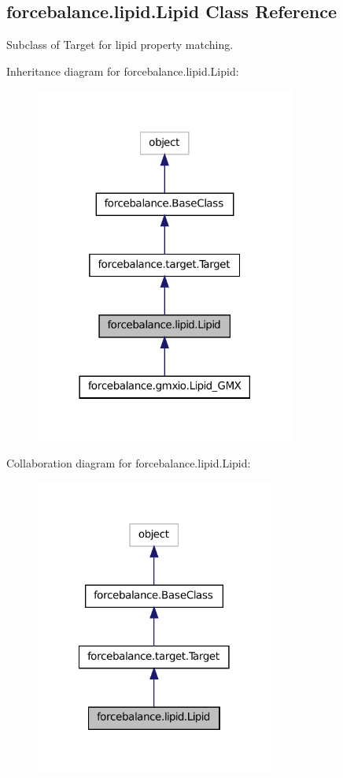 \hypertarget{classforcebalance_1_1lipid_1_1Lipid}{\subsection{forcebalance.\-lipid.\-Lipid Class Reference}
\label{classforcebalance_1_1lipid_1_1Lipid}
}


Subclass of Target for lipid property matching.  




Inheritance diagram for forcebalance.\-lipid.\-Lipid\-:
\nopagebreak
\begin{figure}[H]
\begin{center}
\leavevmode
\includegraphics[width=242pt]{classforcebalance_1_1lipid_1_1Lipid__inherit__graph}
\end{center}
\end{figure}


Collaboration diagram for forcebalance.\-lipid.\-Lipid\-:
\nopagebreak
\begin{figure}[H]
\begin{center}
\leavevmode
\includegraphics[width=222pt]{classforcebalance_1_1lipid_1_1Lipid__coll__graph}
\end{center}
\end{figure}
